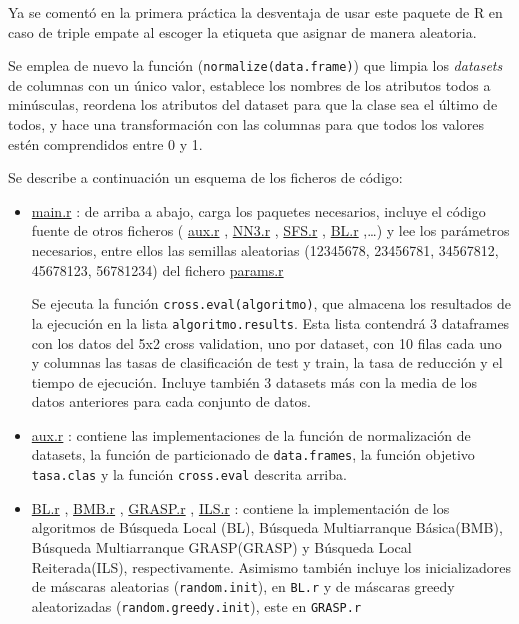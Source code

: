 \documentclass[a4paper,11pt]{article}
\newcommand{\hrefr}[1]{
\href{../bin/#1}{#1}
}
\begin{document}
Ya se comentó en la primera práctica la desventaja de usar este paquete de R en caso de triple empate al escoger la etiqueta
que asignar de manera aleatoria.

Se emplea de nuevo la función (\texttt{normalize(data.frame)}) que limpia los \textit{datasets} de columnas con
un único valor, establece los nombres de los atributos todos a minúsculas, reordena los atributos del dataset para que
la clase sea el último de todos, y hace una transformación con las columnas para que todos los valores estén comprendidos
entre 0 y 1.

Se describe a continuación un esquema de los ficheros de código:
\begin{itemize}
 \item \hrefr{main.r}: de arriba a abajo, carga los paquetes necesarios, incluye el código fuente de otros ficheros
  (\hrefr{aux.r}, \hrefr{NN3.r}, \hrefr{SFS.r}, \hrefr{BL.r},\ldots) y lee los parámetros necesarios, entre ellos las 
  semillas aleatorias (12345678, 23456781, 34567812, 45678123, 56781234) del fichero \hrefr{params.r}
  
  Se ejecuta la función \texttt{cross.eval(algoritmo)}, que almacena los resultados de la ejecución en la lista
  \texttt{algoritmo.results}. Esta lista contendrá 3 dataframes con los datos del 5x2 cross validation, uno por dataset, 
  con 10 filas cada uno  y columnas las tasas de clasificación de test y train, la tasa de reducción y el tiempo de 
  ejecución. Incluye también 3 datasets más con la media de los datos anteriores para cada conjunto de datos.
 
 \item \hrefr{aux.r}: contiene las implementaciones de la función de normalización de datasets, la función de
 particionado de \texttt{data.frames}, la función objetivo \texttt{tasa.clas} y la función \texttt{cross.eval}
 descrita arriba.
 
 \item \hrefr{BL.r}, \hrefr{BMB.r}, \hrefr{GRASP.r}, \hrefr{ILS.r}: contiene la implementación de los algoritmos de Búsqueda Local (BL), Búsqueda 
 Multiarranque Básica(BMB), Búsqueda Multiarranque GRASP(GRASP) y Búsqueda Local Reiterada(ILS), respectivamente. 
 Asimismo también incluye los inicializadores de máscaras aleatorias (\texttt{random.init}), en \texttt{BL.r} 
 y de máscaras greedy aleatorizadas (\texttt{random.greedy.init}), este en \texttt{GRASP.r}
 

\end{itemize}
\end{document}
